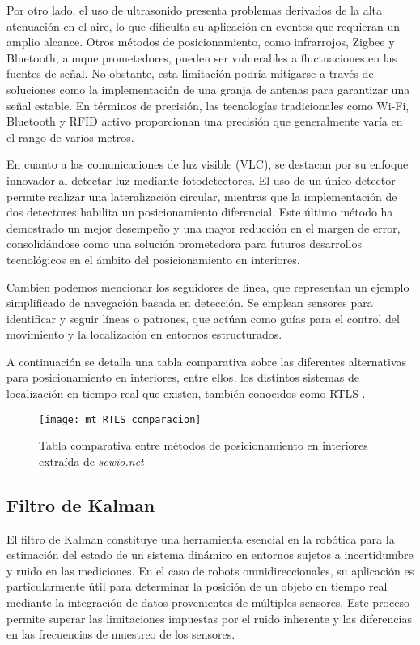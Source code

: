 Por otro lado, el uso de ultrasonido presenta problemas derivados de la alta atenuación en el aire, lo que dificulta su aplicación en eventos que requieran un amplio alcance. Otros métodos de posicionamiento, como infrarrojos, Zigbee y Bluetooth, aunque prometedores, pueden ser vulnerables a fluctuaciones en las fuentes de señal. No obstante, esta limitación podría mitigarse a través de soluciones como la implementación de una granja de antenas para garantizar una señal estable. En términos de precisión, las tecnologías tradicionales como Wi-Fi, Bluetooth y RFID activo proporcionan una precisión que generalmente varía en el rango de varios metros.

En cuanto a las comunicaciones de luz visible (VLC), se destacan por su enfoque innovador al detectar luz mediante fotodetectores. El uso de un único detector permite realizar una lateralización circular, mientras que la implementación de dos detectores habilita un posicionamiento diferencial. Este último método ha demostrado un mejor desempeño y una mayor reducción en el margen de error, consolidándose como una solución prometedora para futuros desarrollos tecnológicos en el ámbito del posicionamiento en interiores.

Cambien podemos mencionar los seguidores de línea, que representan un ejemplo simplificado de navegación basada en detección. Se emplean sensores para identificar y seguir líneas o patrones, que actúan como guías para el control del movimiento y la localización en entornos estructurados.

A continuación se detalla una tabla comparativa sobre las diferentes alternativas para posicionamiento en interiores, entre ellos, los distintos sistemas de localización en tiempo real que existen, también conocidos como RTLS \cite{alammarsurveyindoor}.

\begin{figure}[H]
    \centering
    \hspace*{-1.0cm}
    \texttt{[image: mt\_RTLS\_comparacion]}
    \caption{Tabla comparativa entre métodos de posicionamiento en interiores extraída de \textit{sewio.net} \cite{sewiortls}}
    \label{fig:compmetposindor}
\end{figure}


\subsection{Filtro de Kalman}

El filtro de Kalman constituye una herramienta esencial en la robótica para la estimación del estado de un sistema dinámico en entornos sujetos a incertidumbre y ruido en las mediciones. En el caso de robots omnidireccionales, su aplicación es particularmente útil para determinar la posición de un objeto en tiempo real mediante la integración de datos provenientes de múltiples sensores. Este proceso permite superar las limitaciones impuestas por el ruido inherente y las diferencias en las frecuencias de muestreo de los sensores.

